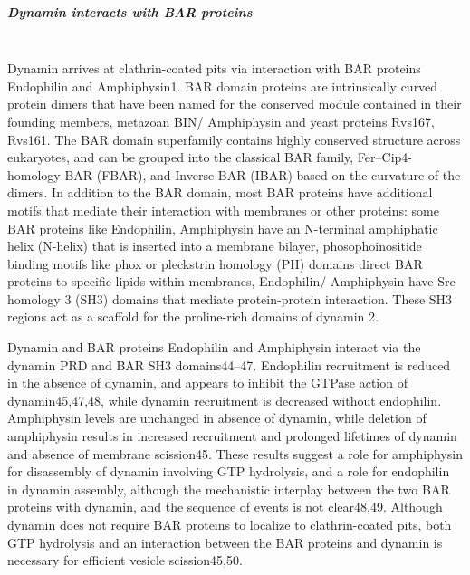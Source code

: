 		\subparagraph{Dynamin interacts with BAR proteins}
		\mbox{} \\
		Dynamin arrives at clathrin-coated pits via interaction with BAR proteins Endophilin and Amphiphysin1. BAR domain proteins are intrinsically curved protein dimers that have been named for the conserved module contained in their founding members, metazoan BIN/ Amphiphysin and yeast proteins Rvs167, Rvs161. The BAR domain superfamily contains highly conserved structure across eukaryotes, and can be grouped into the classical BAR family, Fer–Cip4-homology-BAR (FBAR), and Inverse-BAR (IBAR) based on the curvature of the dimers. In addition to the BAR domain, most BAR proteins have additional motifs that mediate their interaction with membranes or other proteins: some BAR proteins like Endophilin, Amphiphysin have an N-terminal amphiphatic helix (N-helix) that is inserted into a membrane bilayer, phosophoinositide binding motifs like phox or pleckstrin homology (PH) domains direct BAR proteins to specific lipids within membranes, Endophilin/ Amphiphysin have Src homology 3 (SH3) domains that mediate protein-protein interaction. These SH3 regions act as a scaffold for the proline-rich domains of dynamin 2. 

		\vspace{5mm}
		Dynamin and BAR proteins Endophilin and Amphiphysin interact via the dynamin PRD and BAR SH3 domains44–47. Endophilin recruitment is reduced in the absence of dynamin, and appears to inhibit the GTPase action of dynamin45,47,48, while dynamin recruitment is decreased without endophilin. Amphiphysin levels are unchanged in absence of dynamin, while deletion of amphiphysin results in increased recruitment and prolonged lifetimes of dynamin and absence of membrane scission45. These results suggest a role for amphiphysin for disassembly of dynamin involving GTP hydrolysis, and a role for endophilin in dynamin assembly, although the mechanistic interplay between the two BAR proteins with dynamin, and the sequence of events is not clear48,49. Although dynamin does not require BAR proteins to localize to clathrin-coated pits, both GTP hydrolysis and an interaction between the BAR proteins and dynamin is necessary for efficient vesicle scission45,50.



